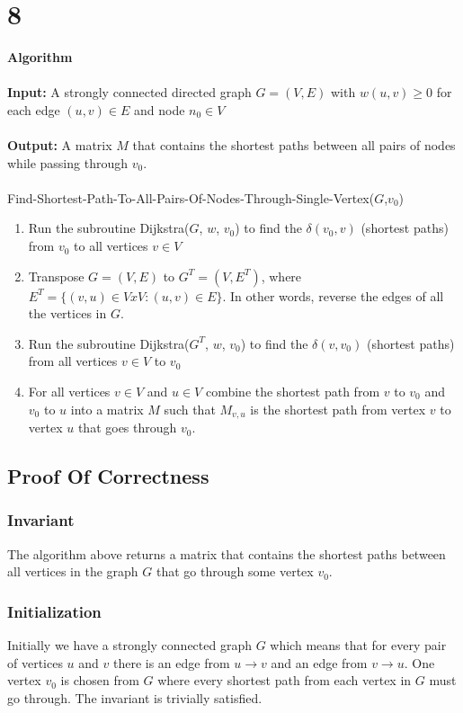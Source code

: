 \documentclass[12pt]{article}
\begin{document}
\section*{8}
{\selectfont
\textbf{Algorithm}\\
\\
\textbf{Input:} A strongly connected directed graph $G=(V,E)$ with $w(u,v) \ge 0$ for each edge $(u,v) \in E$ and node $n_0 \in V$\\
\\
\textbf{Output:} A matrix $M$ that contains the shortest paths between all pairs of nodes while passing through $v_0$.\\
\\
Find-Shortest-Path-To-All-Pairs-Of-Nodes-Through-Single-Vertex($G$,$v_0$)
\begin{enumerate}
\item Run the subroutine Dijkstra($G$, $w$, $v_0$) to find the $\delta{(v_0,v)}$ (shortest paths) from $v_0$ to all vertices $v \in V$\\
\item Transpose $G=(V,E)$ to $G^T = (V,E^T)$, where $E^T = \{(v,u) \in VxV:(u,v)\in E \}$.  In other words, reverse the edges of all the vertices in $G$.
\item Run the subroutine Dijkstra($G^T$, $w$, $v_0$) to find the $\delta{(v, v_0)}$ (shortest paths) from all vertices $v \in V$ to $v_0$\\
\item For all vertices $v \in V$ and $u \in V$ combine the shortest path from $v$ to $v_0$ and $v_0$ to $u$ into a matrix $M$ such that $M_{v,u}$ is the shortest path from vertex $v$ to vertex $u$ that goes through $v_0$.\\ 
\end{enumerate}
}

\subsection*{Proof Of Correctness}
\subsubsection*{Invariant}
The algorithm above returns a matrix that contains the shortest paths between all vertices in the graph $G$ that go through some vertex $v_0$.\\
\subsubsection*{Initialization}
Initially we have a strongly connected graph $G$ which means that for every pair of vertices $u$ and $v$ there is an edge from $u \rightarrow v$ and an edge from $v \rightarrow u$.
One vertex $v_0$ is chosen from $G$ where every shortest path from each vertex in $G$ must go through.  The invariant is trivially satisfied.
\end{document}
